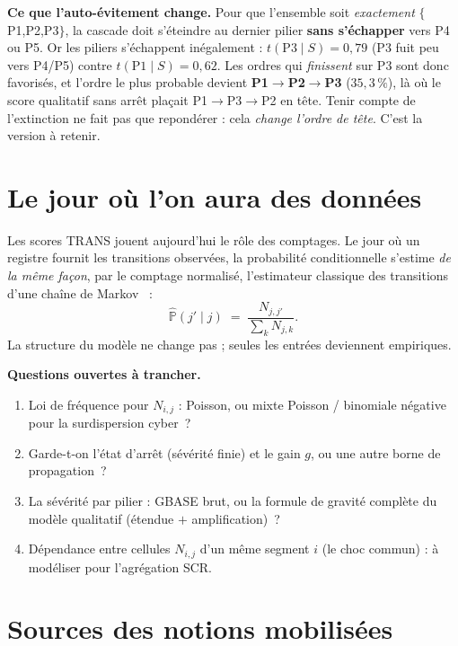 \documentclass[11pt,a4paper]{article}
\begin{document}
\begin{attention}
\textbf{Ce que l'auto-évitement change.} Pour que l'ensemble soit \emph{exactement}
$\{$P1,P2,P3$\}$, la cascade doit s'éteindre au dernier pilier \textbf{sans s'échapper} vers P4
ou P5. Or les piliers s'échappent inégalement : $t(\text{P3}\mid S)=0{,}79$ (P3 fuit peu vers
P4/P5) contre $t(\text{P1}\mid S)=0{,}62$. Les ordres qui \emph{finissent} sur P3 sont donc
favorisés, et l'ordre le plus probable devient \textbf{P1$\to$P2$\to$P3} ($35{,}3\,\%$), là où le
score qualitatif sans arrêt plaçait P1$\to$P3$\to$P2 en tête. Tenir compte de l'extinction ne fait
pas que repondérer : cela \emph{change l'ordre de tête}. C'est la version à retenir.
\end{attention}

\section{Le jour où l'on aura des données}

Les scores TRANS jouent aujourd'hui le rôle des comptages. Le jour où un registre fournit les
transitions observées, la probabilité conditionnelle s'estime \emph{de la même façon}, par le
comptage normalisé, l'estimateur classique des transitions d'une chaîne de
Markov~\cite{AndersonGoodman1957} :
\[
\widehat{\mathbb P}(j' \mid j) \;=\; \frac{N_{j,j'}}{\sum_{k} N_{j,k}} .
\]
La structure du modèle ne change pas ; seules les entrées deviennent empiriques.

\begin{attention}
\textbf{Questions ouvertes à trancher.}
\begin{enumerate}[leftmargin=1.5em,itemsep=1pt,topsep=2pt]
\item Loi de fréquence pour $N_{i,j}$ : Poisson, ou mixte Poisson / binomiale négative pour la
  surdispersion cyber~?
\item Garde-t-on l'état d'arrêt (sévérité finie) et le gain $g$, ou une autre borne de
  propagation~?
\item La sévérité par pilier : GBASE brut, ou la formule de gravité complète du modèle
  qualitatif (étendue $+$ amplification)~?
\item Dépendance entre cellules $N_{i,j}$ d'un même segment $i$ (le choc commun) : à modéliser
  pour l'agrégation SCR.
\end{enumerate}
\end{attention}

\section{Sources des notions mobilisées}
\end{document}
